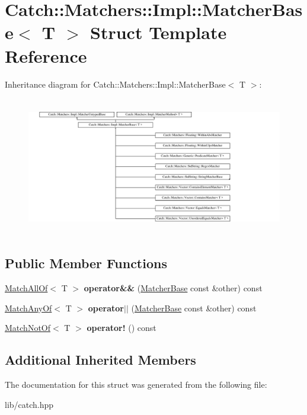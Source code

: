 \hypertarget{struct_catch_1_1_matchers_1_1_impl_1_1_matcher_base}{}\section{Catch\+:\+:Matchers\+:\+:Impl\+:\+:Matcher\+Base$<$ T $>$ Struct Template Reference}
\label{struct_catch_1_1_matchers_1_1_impl_1_1_matcher_base}
Inheritance diagram for Catch\+:\+:Matchers\+:\+:Impl\+:\+:Matcher\+Base$<$ T $>$\+:\begin{figure}[H]
\begin{center}
\leavevmode
\includegraphics[height=6.092978cm]{struct_catch_1_1_matchers_1_1_impl_1_1_matcher_base}
\end{center}
\end{figure}
\subsection*{Public Member Functions}
\begin{DoxyCompactItemize}
\item 
\mbox{\label{struct_catch_1_1_matchers_1_1_impl_1_1_matcher_base_a23c336f6d9457735ddc8dc7ea864d7c9}} 
\mbox{\hyperlink{struct_catch_1_1_matchers_1_1_impl_1_1_match_all_of}{Match\+All\+Of}}$<$ T $>$ {\bfseries operator\&\&} (\mbox{\hyperlink{struct_catch_1_1_matchers_1_1_impl_1_1_matcher_base}{Matcher\+Base}} const \&other) const
\item 
\mbox{\label{struct_catch_1_1_matchers_1_1_impl_1_1_matcher_base_a5f8542b8f1567a6f9c65d0a6da7b679b}} 
\mbox{\hyperlink{struct_catch_1_1_matchers_1_1_impl_1_1_match_any_of}{Match\+Any\+Of}}$<$ T $>$ {\bfseries operator$\vert$$\vert$} (\mbox{\hyperlink{struct_catch_1_1_matchers_1_1_impl_1_1_matcher_base}{Matcher\+Base}} const \&other) const
\item 
\mbox{\label{struct_catch_1_1_matchers_1_1_impl_1_1_matcher_base_a5bb94bf2ff5c7ef73b7c11eb173bdf3b}} 
\mbox{\hyperlink{struct_catch_1_1_matchers_1_1_impl_1_1_match_not_of}{Match\+Not\+Of}}$<$ T $>$ {\bfseries operator!} () const
\end{DoxyCompactItemize}
\subsection*{Additional Inherited Members}


The documentation for this struct was generated from the following file\+:\begin{DoxyCompactItemize}
\item 
lib/catch.\+hpp\end{DoxyCompactItemize}
